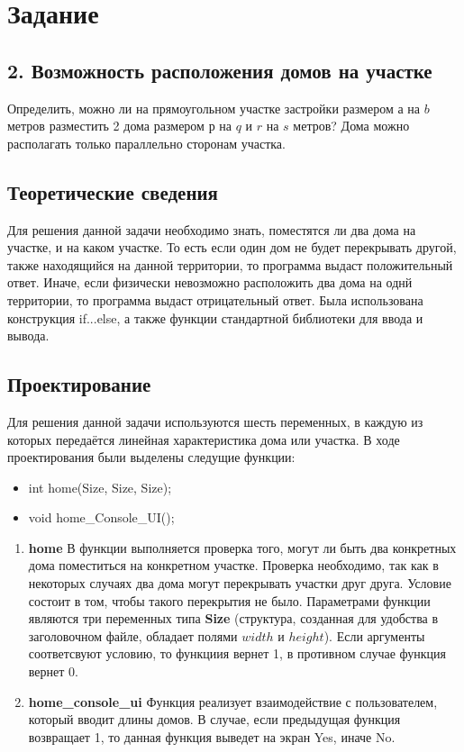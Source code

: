 \documentclass[12pt,a4paper]{report}
\begin{document}
\section{Задание}
\subsection{2. Возможность расположения домов на участке}
\hspace{\parindent}
Определить, можно ли на прямоугольном участке застройки размером $а$ на $b$ метров разместить 2 дома размером $р$ на $q$ и $r$ на $s$ метров? Дома можно располагать только параллельно сторонам участка.

\subsection{Теоретические сведения}
\hspace{\parindent}
Для решения данной задачи необходимо знать, поместятся ли два дома на участке, и на каком участке. То есть если один дом не будет перекрывать другой, также находящийся на данной территории, то программа выдаст положительный ответ. Иначе, если физически невозможно расположить два дома на однй территории, то программа выдаст отрицательный ответ. Была использована конструкция if...else, а также  функции стандартной библиотеки для ввода и вывода.

\subsection{Проектирование}
\hspace{\parindent}
Для решения данной задачи используются шесть переменных, в каждую из которых передаётся линейная характеристика дома или участка.
В ходе проектирования были выделены следущие функции:

\begin{itemize}
\item int home(Size, Size, Size);
\item void home\_Console\_UI();
\end{itemize}

\begin{enumerate}
		\item \textbf{home}
	В  функции выполняется проверка того, могут ли быть два конкретных дома поместиться на конкретном  участке. Проверка необходимо, так как в некоторых случаях два дома могут перекрывать участки друг друга. Условие состоит в том, чтобы такого перекрытия не было.
	Параметрами функции являются три переменных типа \textbf{Size} (структура, созданная для удобства в заголовочном файле, обладает полями $width$ и $height$). Если аргументы соответсвуют условию, то функциия вернет 1, в противном случае функция вернет 0.
	
		\item \textbf{home\_console\_ui}
	Функция реализует взаимодействие с пользователем, который вводит длины домов. В случае, если предыдущая функция возвращает 1, то данная функция выведет на экран Yes, иначе No.
\end{enumerate}
\end{document}
